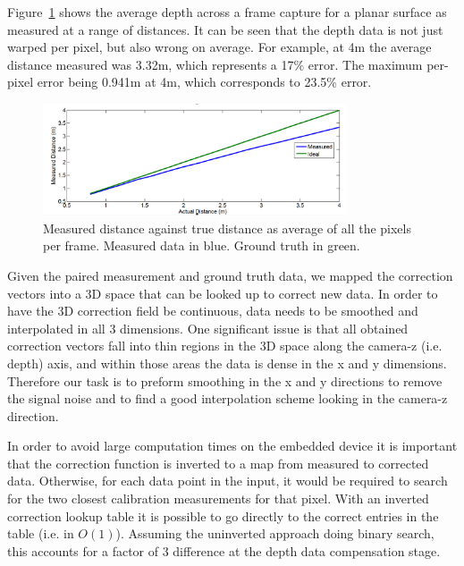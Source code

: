 \documentclass[]{article}
\begin{document}
{Figure~\ref{fig:avDist2} shows the average depth across a frame capture for a planar surface as measured at a range of distances. It can be seen that the depth data is not just warped per pixel, but also wrong on average. For example, at 4m the average distance measured was 3.32m, which represents a 17\% error. The maximum per-pixel error being 0.941m at 4m, which corresponds to 23.5\% error. 

\begin{figure}[htb]
	\begin{center}
		\includegraphics[width = 0.8\textwidth]{avDist2}
	\end{center}
	\caption{Measured distance against true distance as average of all the pixels per frame. Measured data in blue. Ground truth in green.}
	\label{fig:avDist2}
\end{figure}

Given the paired measurement and ground truth data, we mapped the correction vectors into a 3D space that can be looked up to correct new data. In order to have the 3D correction field be continuous, data needs to be smoothed and interpolated in all 3 dimensions. One significant issue is that all obtained correction vectors fall into thin regions in the 3D space along the camera-z (i.e. depth) axis, and within those areas the data is dense in the x and y dimensions. Therefore our task is to preform smoothing in the x and y directions to remove the signal noise and to find a good interpolation scheme looking in the camera-z direction.  

In order to avoid large computation times on the embedded device it is important that the correction function is inverted to a map from measured to corrected data. Otherwise, for each data point in the input, it would be required to search for the two closest calibration measurements for that pixel. With an inverted correction lookup table it is possible to go directly to the correct entries in the table (i.e. in $O(1)$). Assuming the uninverted approach doing binary search, this accounts for a factor of 3 difference at the depth data compensation stage. 

}
\end{document}

